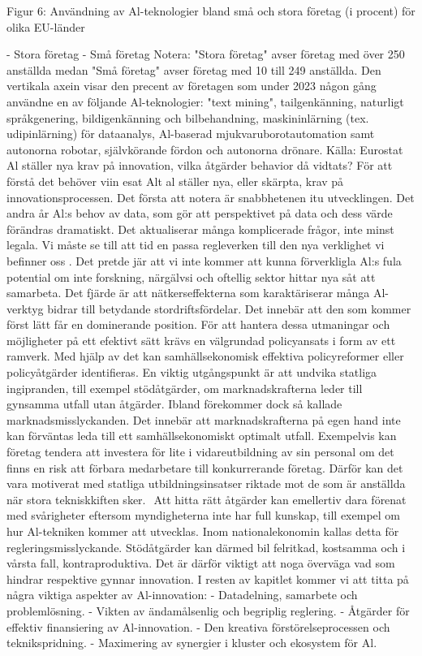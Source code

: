 {{{{{{{{{{{{Figur 6: Användning av Al-teknologier bland små och stora företag (i procent) för olika EU-länder

- Stora företag - Små företag
Notera: "Stora företag" avser företag med över 250 anställda medan "Små företag" avser företag med 10 till 249 anställda. Den vertikala axein visar den precent av företagen som under 2023 någon gång användne en av följande Al-teknologier: "text mining", tailgenkänning, naturligt språkgenering, bildigenkänning och bilbehandning, maskininlärning (tex. udipinlärning) för dataanalys, Al-baserad mjukvaruborotautomation samt autonorna robotar, självkörande fördon och autonorna drönare.
Källa: Eurostat
Al ställer nya krav på innovation, vilka åtgärder behavior då vidtats? För att förstå det behöver viin esat Alt al ställer nya, eller skärpta, krav på innovationsprocessen. Det första att notera är snabbhetenen itu utvecklingen. Det andra år Al:s behov av data, som gör att perspektivet på data och dess värde förändras dramatiskt. Det aktualiserar många komplicerade frågor, inte minst legala. Vi måste se till att tid en passa regleverken till den nya verklighet vi befinner oss . Det pretde jär att vi inte kommer att kunna förverkligla Al:s fula potential om inte forskning, närgälvsi och oftellig sektor hittar nya såt att samarbeta. Det fjärde är att nätkerseffekterna som karaktäriserar många Al-verktyg bidrar till betydande stordriftsfördelar. Det innebär att den som kommer först lätt får en dominerande position.
För att hantera dessa utmaningar och möjligheter på ett efektivt sätt krävs en välgrundad policyansats i form av ett ramverk. Med hjälp av det kan samhällsekonomisk effektiva policyreformer eller policyåtgärder identifieras. En viktig utgångspunkt är att undvika statliga ingipranden, till exempel stödåtgärder, om marknadskrafterna leder till gynsamma utfall utan åtgärder. Ibland förekommer dock så kallade marknadsmisslyckanden. Det innebär att marknadskrafterna på egen hand inte kan förväntas leda till ett samhällsekonomiskt optimalt utfall. Exempelvis kan företag tendera att investera för lite i vidareutbildning av sin personal om det finns en risk att förbara medarbetare till konkurrerande företag. Därför kan det vara motiverat med statliga utbildningsinsatser riktade mot de som är anställda när stora tekniskkiften sker. \({ }^{}\) Att hitta rätt åtgärder kan emellertiv dara förenat med svårigheter eftersom myndigheterna inte har full kunskap, till exempel om hur Al-tekniken kommer att utvecklas. Inom nationalekonomin kallas detta för regleringsmisslyckande. Stödåtgärder kan därmed bil felritkad, kostsamma och i vårsta fall, kontraproduktiva. Det är därför viktigt att noga överväga vad som hindrar respektive gynnar innovation.
I resten av kapitlet kommer vi att titta på några viktiga aspekter av Al-innovation:
- Datadelning, samarbete och problemlösning.
- Vikten av ändamålsenlig och begriplig reglering.
- Åtgärder för effektiv finansiering av Al-innovation.
- Den kreativa förstörelseprocessen och teknikspridning.
- Maximering av synergier i kluster och ekosystem för Al.

}}}}}}}}}}}}
